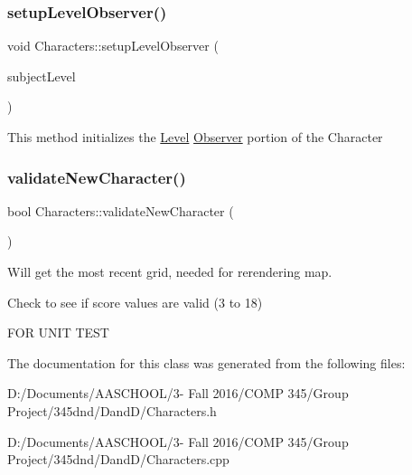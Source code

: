 \subsubsection{\texorpdfstring{setup\+Level\+Observer()}{setupLevelObserver()}}
{\footnotesize\ttfamily void Characters\+::setup\+Level\+Observer (\begin{DoxyParamCaption}\item[{\hyperlink{class_pre_built_level}{Pre\+Built\+Level} $\ast$}]{subject\+Level }\end{DoxyParamCaption})\hspace{0.3cm}{\ttfamily [virtual]}}

This method initializes the \hyperlink{class_level}{Level} \hyperlink{class_observer}{Observer} portion of the Character \hypertarget{class_characters_a1273e2d7fe2e959cd3ed513c5717f6b7}{}\label{class_characters_a1273e2d7fe2e959cd3ed513c5717f6b7} 
\subsubsection{\texorpdfstring{validate\+New\+Character()}{validateNewCharacter()}}
{\footnotesize\ttfamily bool Characters\+::validate\+New\+Character (\begin{DoxyParamCaption}{ }\end{DoxyParamCaption})}



Will get the most recent grid, needed for rerendering map. 

Check to see if score values are valid (3 to 18)

F\+OR U\+N\+IT T\+E\+ST 

The documentation for this class was generated from the following files\+:\begin{DoxyCompactItemize}
\item 
D\+:/\+Documents/\+A\+A\+S\+C\+H\+O\+O\+L/3-\/ Fall 2016/\+C\+O\+M\+P 345/\+Group Project/345dnd/\+Dand\+D/Characters.\+h\item 
D\+:/\+Documents/\+A\+A\+S\+C\+H\+O\+O\+L/3-\/ Fall 2016/\+C\+O\+M\+P 345/\+Group Project/345dnd/\+Dand\+D/Characters.\+cpp\end{DoxyCompactItemize}
